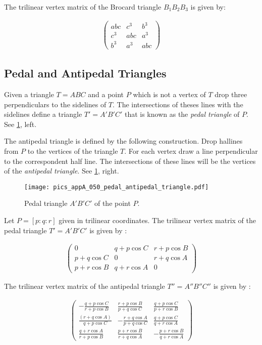 The trilinear vertex matrix of the Brocard triangle $B_1B_2B_3$ is given by:

\begin{align*}
   \left(\begin{matrix} abc& c^3& b^3\\
   c^3&abc & a^3\\
   b^3 &a^3 &abc\end{matrix}\right)
\end{align*}

\subsection{Pedal and Antipedal Triangles}

Given a triangle $T=ABC$  and a point $P$ which is not a vertex of $T$ drop three perpendiculars to the sidelines of $T$. The intersections of theses lines with the sidelines define a triangle $T'=A'B'C'$ that is known as the {\em pedal triangle} of $P$. See \cref{fig:pedal_triangle}, left.

The antipedal triangle is defined by the following construction.
Drop hallines from $P$ to the vertices of the triangle $T$. For each vertex draw a line perpendicular to the correspondent half  line. The intersections of these  lines will be the vertices of the {\em antipedal triangle}. See \cref{fig:pedal_triangle}, right.
 \begin{figure}[H]
      \texttt{[image: pics\_appA\_050\_pedal\_antipedal\_triangle.pdf]}
    \caption{Pedal triangle $A'B'C'$ of the point $P$.}
    \label{fig:pedal_triangle}
\end{figure}

Let $P=[p:q:r]$ given in trilinear coordinates. The trilinear vertex matrix of the pedal triangle $T'=A'B'C'$ is given by \cite{mw}:

\begin{align*}
   \left(\begin{matrix} 0& q+p\cos C& r+p\cos B\\
   p+q\cos C &0 & r+q\cos A\\
   p+r\cos B & q+r\cos A &0\end{matrix}\right)
\end{align*}


The trilinear vertex matrix of the antipedal triangle $T''=A''B''C''$ is given by \cite{mw}:
 
\begin{align*}
   \left(\begin{matrix} - \frac{ q + p \cos C}{r + p \cos B}& \frac{r + p \cos B}{p + q \cos C}& \frac{q + p \cos C}{p + r \cos B}\\
    \frac{ (r + q \cos A)}{q + p \cos C}& -\frac{r + q \cos A}{p + q \cos  C}& \frac{q + p \cos C}{q + r \cos A}\\
   \frac{q + r \cos A}{r + p \cos B}&\frac{ p + r \cos B}{r + q \cos A} & - \frac{p + r \cos B}{q + r \cos A}\end{matrix}\right)
\end{align*}

